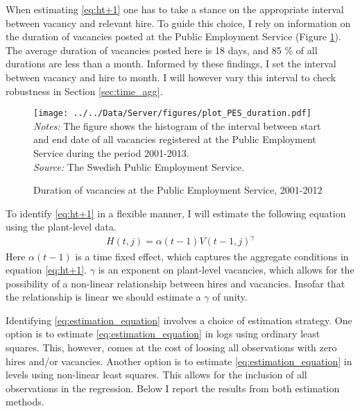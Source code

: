 When estimating \eqref{eq:ht+1} one has to take a stance on the appropriate interval between vacancy and relevant hire. To guide this choice, I rely on information on the duration of vacancies posted at the Public Employment Service (Figure \ref{fig:PES_duration}). The average duration of vacancies posted here is 18 days, and 85 \% of all durations are less than a month. Informed by these findings, I set the interval between vacancy and hire to month. I will however vary this interval to check robustness in Section \ref{sec:time_agg}.

\begin{figure}[t]
\centering
\caption{Duration of vacancies at the Public Employment Service, 2001-2012}
\texttt{[image: ../../Data/Server/figures/plot\_PES\_duration.pdf]}
\flushleft
\footnotesize{\emph{Notes:} The figure shows the histogram of the interval between start and end date of all vacancies registered at the Public Employment Service during the period 2001-2013.} \\
\footnotesize{\emph{Source:} The Swedish Public Employment Service.}
\label{fig:PES_duration}
\end{figure}

To identify \eqref{eq:ht+1} in a flexible manner, I will estimate the following equation using the plant-level data.
\begin{align}
H(t,j)=\alpha(t-1) V(t-1,j)^{\gamma}
\label{eq:estimation_equation}
\end{align}
Here $\alpha(t-1)$ is a time fixed effect, which captures the aggregate conditions in equation \eqref{eq:ht+1}. $\gamma$ is an exponent on plant-level vacancies, which allows for the possibility of a non-linear relationship between hires and vacancies. Insofar that the relationship is linear we should estimate a $\gamma$ of unity.

Identifying \eqref{eq:estimation_equation} involves a choice of estimation strategy. One option is to estimate \eqref{eq:estimation_equation} in logs using ordinary least squares. This, however, comes at the cost of loosing all observations with zero hires and/or vacancies. Another option is to estimate \eqref{eq:estimation_equation} in levels using non-linear least squares. This allows for the inclusion of all observations in the regression. Below I report the results from both estimation methods. %

